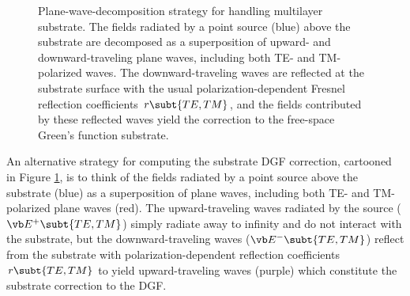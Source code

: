 \documentclass[letterpaper]{article}
\begin{document}
\begin{figure}
\begin{center}
\caption{Plane-wave-decomposition strategy for handling 
multilayer substrate. The fields radiated by a point source (blue)
above the substrate are decomposed as a superposition of
upward- and downward-traveling plane waves, including 
both TE- and TM-polarized waves. The downward-traveling waves
are reflected at the substrate surface with the usual
polarization-dependent Fresnel reflection coefficients $r\subt{TE,TM}$,
and the fields contributed by these reflected waves
yield the correction to the free-space Green's function
substrate.
}
\label{PlaneWaveFigure}
\end{center}
\end{figure}

An alternative strategy for computing the substrate DGF 
correction, cartooned in Figure \ref{PlaneWaveFigure}, is
to think of the fields radiated by a point source above
the substrate (blue) as a superposition of 
plane waves, including both TE- and TM-polarized
plane waves (red). The upward-traveling waves radiated by the 
source ($\vb E^+\subt{TE,TM}$) simply radiate away to 
infinity and do not interact with the substrate, but the
downward-traveling waves
($\vb E^-\subt{TE,TM}$) reflect from the substrate 
with polarization-dependent reflection coefficients
$r\subt{TE,TM}$ to yield upward-traveling waves (purple)
which constitute the substrate correction to the DGF.
\end{document}
